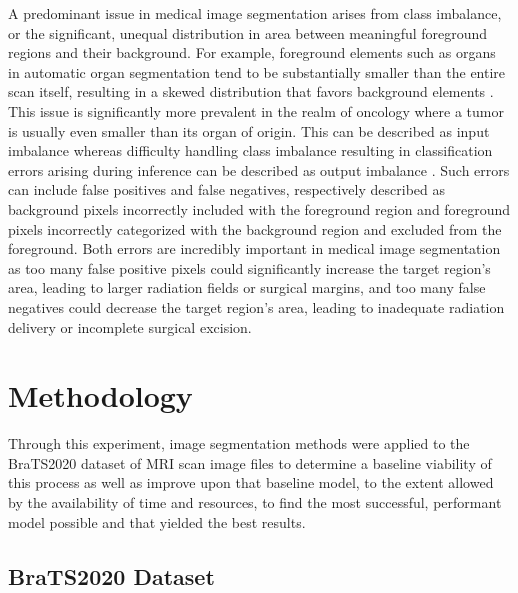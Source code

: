\documentclass{article}
\begin{document}
\begin{multicols}{2}
A predominant issue in medical image segmentation arises from class imbalance, or the significant, unequal distribution in area between meaningful foreground regions and their background. For example, foreground elements such as organs in automatic organ segmentation tend to be substantially smaller than the entire scan itself, resulting in a skewed distribution that favors background elements \cite{organSeg_roth2015}. This issue is significantly more prevalent in the realm of oncology where a tumor is usually even smaller than its organ of origin. This can be described as input imbalance whereas difficulty handling class imbalance resulting in classification errors arising during inference can be described as output imbalance \cite{comboLoss_taghanaki2019}. Such errors can include false positives and false negatives, respectively described as background pixels incorrectly included with the foreground region and foreground pixels incorrectly categorized with the background region and excluded from the foreground. Both errors are incredibly important in medical image segmentation as too many false positive pixels could significantly increase the target region’s area, leading to larger radiation fields or surgical margins, and too many false negatives could decrease the target region’s area, leading to inadequate radiation delivery or incomplete surgical excision.

\section{Methodology}

Through this experiment, image segmentation methods were applied to the BraTS2020 dataset of MRI scan image files to determine a baseline viability of this process as well as improve upon that baseline model, to the extent allowed by the availability of time and resources, to find the most successful, performant model possible and that yielded the best results.

\subsection{BraTS2020 Dataset}
	

\end{multicols}
\end{document}
